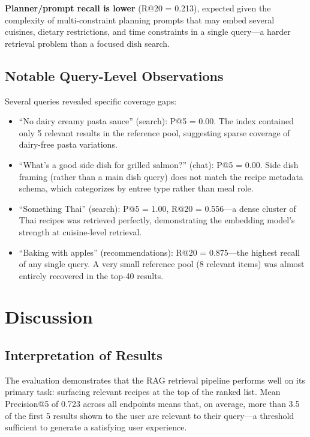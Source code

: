 \documentclass[12pt,letterpaper]{article}
\begin{document}
\textbf{Planner/prompt recall is lower} (R@20 = 0.213), expected given the complexity of
multi-constraint planning prompts that may embed several cuisines, dietary restrictions, and
time constraints in a single query---a harder retrieval problem than a focused dish search.

\subsection{Notable Query-Level Observations}

Several queries revealed specific coverage gaps:

\begin{itemize}[itemsep=2pt]
  \item ``No dairy creamy pasta sauce'' (search): P@5 = 0.00. The index contained only
    5 relevant results in the reference pool, suggesting sparse coverage of dairy-free
    pasta variations.

  \item ``What's a good side dish for grilled salmon?'' (chat): P@5 = 0.00. Side dish
    framing (rather than a main dish query) does not match the recipe metadata schema,
    which categorizes by entree type rather than meal role.

  \item ``Something Thai'' (search): P@5 = 1.00, R@20 = 0.556---a dense cluster of
    Thai recipes was retrieved perfectly, demonstrating the embedding model's strength
    at cuisine-level retrieval.

  \item ``Baking with apples'' (recommendations): R@20 = 0.875---the highest recall of
    any single query. A very small reference pool (8 relevant items) was almost entirely
    recovered in the top-40 results.
\end{itemize}

\section{Discussion}
\label{sec:discussion}

\subsection{Interpretation of Results}

The evaluation demonstrates that the RAG retrieval pipeline performs well on its primary
task: surfacing relevant recipes at the top of the ranked list. Mean Precision@5 of 0.723
across all endpoints means that, on average, more than 3.5 of the first 5 results shown to
the user are relevant to their query---a threshold sufficient to generate a satisfying user
experience.
\end{document}
